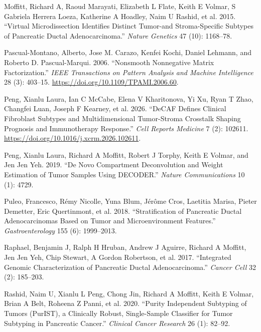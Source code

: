\documentclass[
]{article}
\newlength{\cslhangindent}
\newenvironment{CSLReferences}[2] %
 {\begin{list}{}{%
  \setlength{\itemindent}{0pt}
  \setlength{\leftmargin}{0pt}
  \setlength{\parsep}{0pt}
  \ifodd #1
   \setlength{\leftmargin}{\cslhangindent}
   \setlength{\itemindent}{-1\cslhangindent}
  \fi
  \setlength{\itemsep}{#2\baselineskip}}}
 {\end{list}}
\begin{document}
\begin{CSLReferences}{1}{0}
Moffitt, Richard A, Raoud Marayati, Elizabeth L Flate, Keith E Volmar, S
Gabriela Herrera Loeza, Katherine A Hoadley, Naim U Rashid, et al. 2015.
{``Virtual Microdissection Identifies Distinct Tumor-and Stroma-Specific
Subtypes of Pancreatic Ductal Adenocarcinoma.''} \emph{Nature Genetics}
47 (10): 1168--78.

Pascual-Montano, Alberto, Jose M. Carazo, Kenfei Kochi, Daniel Lehmann,
and Roberto D. Pascual-Marqui. 2006. {``Nonsmooth Nonnegative Matrix
Factorization.''} \emph{IEEE Transactions on Pattern Analysis and
Machine Intelligence} 28 (3): 403--15.
\url{https://doi.org/10.1109/TPAMI.2006.60}.

Peng, Xianlu Laura, Ian C McCabe, Elena V Kharitonova, Yi Xu, Ryan T
Zhao, Changfei Luan, Joseph F Kearney, et al. 2026. {``DeCAF Defines
Clinical Fibroblast Subtypes and Multidimensional Tumor-Stroma Crosstalk
Shaping Prognosis and Immunotherapy Response.''} \emph{Cell Reports
Medicine} 7 (2): 102611.
\url{https://doi.org/10.1016/j.xcrm.2026.102611}.

Peng, Xianlu Laura, Richard A Moffitt, Robert J Torphy, Keith E Volmar,
and Jen Jen Yeh. 2019. {``De Novo Compartment Deconvolution and Weight
Estimation of Tumor Samples Using DECODER.''} \emph{Nature
Communications} 10 (1): 4729.

Puleo, Francesco, Rémy Nicolle, Yuna Blum, Jérôme Cros, Laetitia Marisa,
Pieter Demetter, Eric Quertinmont, et al. 2018. {``Stratification of
Pancreatic Ductal Adenocarcinomas Based on Tumor and Microenvironment
Features.''} \emph{Gastroenterology} 155 (6): 1999--2013.

Raphael, Benjamin J, Ralph H Hruban, Andrew J Aguirre, Richard A
Moffitt, Jen Jen Yeh, Chip Stewart, A Gordon Robertson, et al. 2017.
{``Integrated Genomic Characterization of Pancreatic Ductal
Adenocarcinoma.''} \emph{Cancer Cell} 32 (2): 185--203.

Rashid, Naim U, Xianlu L Peng, Chong Jin, Richard A Moffitt, Keith E
Volmar, Brian A Belt, Roheena Z Panni, et al. 2020. {``Purity
Independent Subtyping of Tumors (PurIST), a Clinically Robust,
Single-Sample Classifier for Tumor Subtyping in Pancreatic Cancer.''}
\emph{Clinical Cancer Research} 26 (1): 82--92.


\end{CSLReferences}
\end{document}
